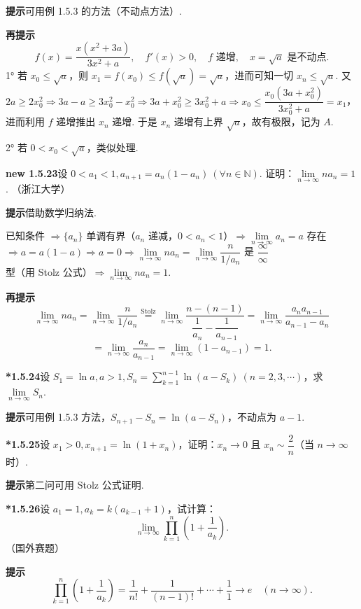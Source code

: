 \documentclass[UTF8, 12pt, fontset=fandol, oneside]{ctexart}
\begin{document}
\noindent\textbf{提示}\quad 可用例 1.5.3 的方法（不动点方法）.

\noindent\textbf{再提示}\quad
\[
  f(x)=\frac{x(x^2+3a)}{3x^2+a},\quad f'(x)>0,\quad f\text{ 递增},\quad x=\sqrt a\text{ 是不动点}.
\]
1° 若 $x_0\le \sqrt a$，则 $x_1=f(x_0)\le f(\sqrt a)=\sqrt a$，进而可知一切 $x_n\le \sqrt a$. 又 $2a\ge 2x_0^2\Rightarrow 3a-a\ge 3x_0^2-x_0^2\Rightarrow 3a+x_0^2\ge 3x_0^2+a\Rightarrow x_0\le \dfrac{x_0(3a+x_0^2)}{3x_0^2+a}=x_1$，进而利用 $f$ 递增推出 $x_n$ 递增. 于是 $x_n$ 递增有上界 $\sqrt a$，故有极限，记为 $A$.

2° 若 $0<x_0<\sqrt a$，类似处理.

\noindent\textbf{new 1.5.23}\quad 设 $0<a_1<1,a_{n+1}=a_n(1-a_n)\ (\forall n\in\mathbb{N})$. 证明：$\lim\limits_{n\to\infty}na_n=1$. （浙江大学）

\noindent\textbf{提示}\quad 借助数学归纳法.

已知条件 $\Rightarrow \{a_n\}$ 单调有界（$a_n$ 递减，$0<a_n<1$）$\Rightarrow \lim\limits_{n\to\infty}a_n=a$ 存在 $\Rightarrow a=a(1-a)\Rightarrow a=0\Rightarrow \lim\limits_{n\to\infty}na_n=\lim\limits_{n\to\infty}\dfrac{n}{1/a_n}$ 是 $\dfrac{\infty}{\infty}$ 型（用 Stolz 公式）$\Rightarrow \lim\limits_{n\to\infty}na_n=1$.

\noindent\textbf{再提示}\quad
\[
  \lim_{n\to\infty}na_n
  =\lim_{n\to\infty}\frac n{1/a_n}
  \stackrel{\mathrm{Stolz}}{=}
  \lim_{n\to\infty}\frac{n-(n-1)}{\dfrac1{a_n}-\dfrac1{a_{n-1}}}
  =\lim_{n\to\infty}\frac{a_na_{n-1}}{a_{n-1}-a_n}
\]
\[
  =\lim_{n\to\infty}\frac{a_n}{a_{n-1}}
  =\lim_{n\to\infty}(1-a_{n-1})=1.
\]

\noindent\textbf{*1.5.24}\quad 设 $S_1=\ln a,a>1,S_n=\sum\limits_{k=1}^{n-1}\ln(a-S_k)\ (n=2,3,\cdots)$，求 $\lim\limits_{n\to\infty}S_n$.

\noindent\textbf{提示}\quad 可用例 1.5.3 方法，$S_{n+1}-S_n=\ln(a-S_n)$，不动点为 $a-1$.

\noindent\textbf{*1.5.25}\quad 设 $x_1>0,x_{n+1}=\ln(1+x_n)$，证明：$x_n\to0$ 且 $x_n\sim \dfrac2n$（当 $n\to\infty$ 时）.

\noindent\textbf{提示}\quad 第二问可用 Stolz 公式证明.

\noindent\textbf{*1.5.26}\quad 设 $a_1=1,a_k=k(a_{k-1}+1)$，试计算：
\[
  \lim_{n\to\infty}\prod_{k=1}^n\left(1+\frac1{a_k}\right).
\]
（国外赛题）

\noindent\textbf{提示}\quad
\[
  \prod_{k=1}^n\left(1+\frac1{a_k}\right)
  =\frac1{n!}+\frac1{(n-1)!}+\cdots+\frac11\to e\quad (n\to\infty).
\]
\end{document}

